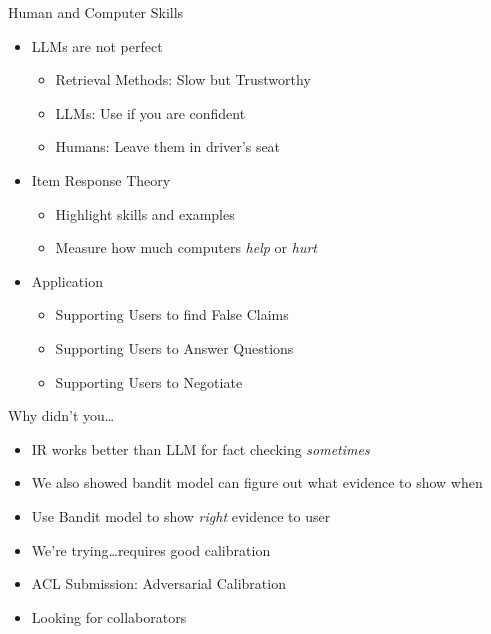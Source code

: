 \documentclass[compress]{beamer}
\newcommand{\fsi}[2]{
\begin{frame}[plain]
\vspace*{-1pt}
\makebox[\linewidth]{\texttt{[image: \#1]}}
\begin{center}
#2
\end{center}
\end{frame}
}
\begin{document}
\begin{frame}{Human and Computer Skills}
	\begin{itemize}
	\item LLMs are not perfect
	\begin{itemize}
		\item Retrieval Methods: Slow but Trustworthy
		\item LLMs: Use if you are confident
		\item Humans: Leave them in driver's seat
	\end{itemize}
	\item Item Response Theory
	\begin{itemize}
		\item Highlight skills and examples
		\item Measure how much computers \emph{help} or \emph{hurt}
	\end{itemize}
	\item Application
	\begin{itemize}
		\item Supporting Users to find False Claims
		\item Supporting Users to Answer Questions
		\item Supporting Users to Negotiate
	\end{itemize}
	\end{itemize}
\end{frame}

\begin{frame}{Why didn't you\dots}
  \begin{itemize}
  \item IR works better than LLM for fact checking \emph{sometimes}
  \item We also showed bandit model can figure out what evidence to show when
  \item Use Bandit model to show \emph{right} evidence to user
    \pause
  \item We're trying\dots requires good calibration
  \item ACL Submission: Adversarial Calibration
  \item Looking for collaborators
  \end{itemize}
\end{frame}

\fsi{general_figures/black_box_outline}{}
\fsi{general_figures/kill_all_humans}{}
\fsi{general_figures/blackbox}{}
\fsi{general_figures/tng_poker}{}
\end{document}
